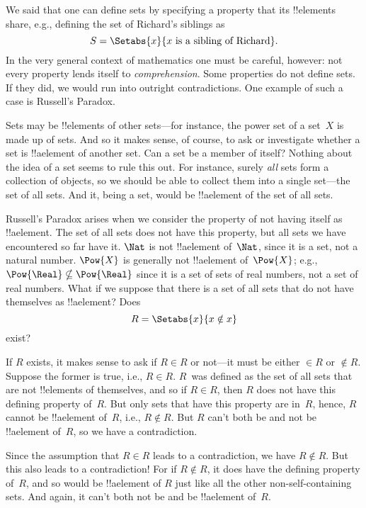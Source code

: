 \documentclass[../../../include/open-logic-section]{subfiles}
\begin{document}

We said that one can define sets by specifying a property that its
!!{element}s share, e.g., defining the set of Richard's siblings as
\[
S = \Setabs{x}{x \text{ is a sibling of Richard}}.
\]
In the very general context of mathematics one must be careful,
however: not every property lends itself to \emph{comprehension}. Some
properties do not define sets.  If they did, we would run into
outright contradictions. One example of such a case is Russell's
Paradox.

Sets may be !!{element}s of other sets---for instance, the power set
of a set~$X$ is made up of sets.  And so it makes sense, of course, to
ask or investigate whether a set is !!a{element} of another set.  Can
a set be a member of itself?  Nothing about the idea of a set seems to
rule this out. For instance, surely \emph{all} sets form a collection
of objects, so we should be able to collect them into a single
set---the set of all sets. And it, being a set, would be !!a{element}
of the set of all sets.

Russell's Paradox arises when we consider the property of not having
itself as !!a{element}.  The set of all sets does not have this
property, but all sets we have encountered so far have it. $\Nat$ is
not !!a{element} of~$\Nat$, since it is a set, not a natural
number. $\Pow{X}$ is generally not !!a{element} of~$\Pow{X}$; e.g.,
$\Pow{\Real} \nsubseteq \Pow{\Real}$ since it is a set of sets of real
numbers, not a set of real numbers.  What if we suppose that there is
a set of all sets that do not have themselves as !!a{element}? Does
\[
R = \Setabs{x}{x \notin x}
\]
exist?

If $R$ exists, it makes sense to ask if $R \in R$ or not---it must be
either $\in R$ or $\notin R$. Suppose the former is true, i.e., $R \in
R$. $R$~was defined as the set of all sets that are not !!{element}s
of themselves, and so if $R \in R$, then $R$ does not have this
defining property of~$R$. But only sets that have this property are
in~$R$, hence, $R$ cannot be !!a{element} of~$R$, i.e., $R \notin
R$. But $R$ can't both be and not be !!a{element} of~$R$, so we have a
contradiction.

Since the assumption that $R \in R$ leads to a contradiction, we have
$R \notin R$. But this also leads to a contradiction!{} For if $R
\notin R$, it does have the defining property of~$R$, and so would be
!!a{element} of $R$ just like all the other non-self-containing sets.
And again, it can't both not be and be !!a{element} of~$R$.
\end{document}

